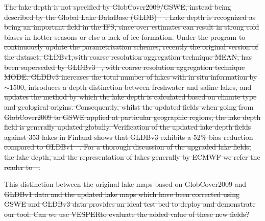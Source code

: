 \documentclass[hess, twostagejnl]{copernicus}
\providecommand{\DIFadd}[1]{{\protect\color{blue}\uwave{#1}}} %
\providecommand{\DIFdel}[1]{{\protect\color{red}\sout{#1}}}                      %
\providecommand{\DIFaddbegin}{} %
\providecommand{\DIFaddend}{} %
\providecommand{\DIFdelbegin}{} %
\providecommand{\DIFdelend}{} %
\begin{document}
\DIFdel{The lake depth is not specified by GlobCover2009/GSWE, instead being described by the Global Lake DataBase (GLDB) \mbox{%
\cite{Kourzeneva2012}}\hskip0pt%
. Lake depth is recognized as being an important field in the IFS, since over estimates can result in strong cold biases in hotter seasons or else a lack of ice formation. Under the program to continuously update the parametrisation schemes, recently the original version of the dataset, GLDBv1,with coarse resolution aggregation technique MEAN, has been superseded by GLDBv3\mbox{%
\cite{Choulga2014}}\hskip0pt%
, with coarse resolution aggregation technique MODE. GLDBv3 increases the total number of lakes with in situ information by $\sim1500$, introduces a depth distinction between freshwater and saline lakes, and updates the method by which the lake depth is calculated based on climate type and geological origins. Consequently, whilst the updated fields when going from GlobCover2009 to GSWE applied at particular geographic regions, the lake depth field is generally updated globally. Verification of the updated lake depth fields against 353 lakes in Finland shows that GLDBv3 exhibits a 52$\%$ bias reduction compared to GLDBv1\mbox{%
\cite{Choulga2019}}\hskip0pt%
. For a thorough discussion of the upgraded lake fields, the lake depth, and the representation of lakes generally by ECMWF we refer the reader to\mbox{%
\cite{Choulga2019,Boussetta2021}}\hskip0pt%
. }\DIFdelend \DIFaddbegin \DIFadd{3.0K for VESPER\_V15. }\DIFaddend \newline 

 \DIFdelbegin %
\DIFdel{This distinction between the original lake maps based on GlobCover2009 and GLDBv1 data and the updated lake maps which have been corrected using GSWE and GLDBv3 data provides an ideal test bed to deploy and demonstrate our tool. Can we use VESPERto evaluate the added value of these new fields? 
}%

\end{document}
